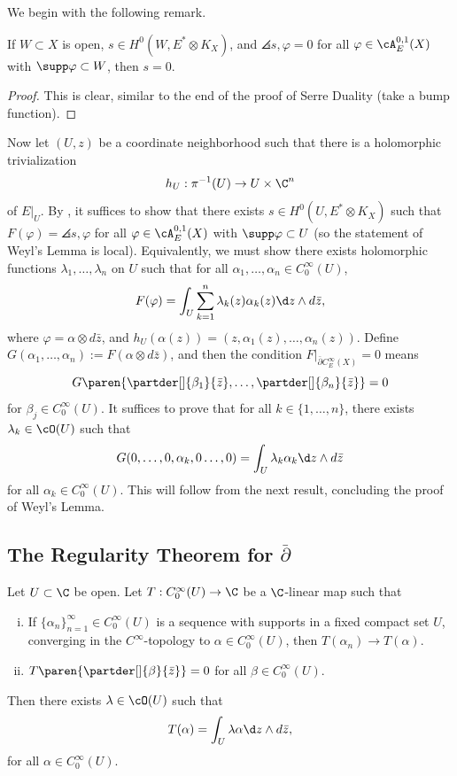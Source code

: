 \documentclass[11pt]{report}
\begin{document}
We begin with the following remark.
\begin{rmk} \label{rmk:inner-prod-0-s-0}
If $W \subset X$ is open, $s \in H^0(W,E^*\otimes K_X)$, and $\angles{s,\varphi}=0$ for all $\varphi \in \cA_E^{0,1}(X)$ with $\supp \varphi \subset W$, then $s=0$.
\end{rmk}

\begin{proof}
This is clear, similar to the end of the proof of Serre Duality (take a bump function).
\end{proof}

Now let $(U,z)$ be a coordinate neighborhood such that there is a holomorphic trivialization
\[
h_U: \pi^{-1}(U) \to U \times \C^n
\]
of $E|_U$. By , it suffices to show that there exists $s \in H^0(U,E^* \otimes K_X)$ such that $F(\varphi)= \angles{s,\varphi}$ for all $\varphi \in \cA_E^{0,1}(X)$ with $\supp \varphi \subset U$ (so the statement of Weyl's Lemma is local). Equivalently, we must show there exists holomorphic functions $\lambda_1,\dots,\lambda_n$ on $U$ such that for all $\alpha_1,\dots,\alpha_n \in C_0^\infty (U)$,
\[
F(\varphi)= \int _U \sum_{k=1}^n \lambda_k(z)\alpha_k(z)\d z \land d \bar z,
\]
where $\varphi = \alpha \otimes d\bar z$, and $h_U(\alpha(z))=(z,\alpha_1(z),\dots,\alpha_n(z))$. Define $G(\alpha_1,\dots,\alpha_n):= F(\alpha \otimes d \bar z)$, and then the condition $F|_{\bar \partial C_E^\infty (X)}=0$ means
\[
G\paren{ \partder[]{\beta_1}{\bar z},\dots, \partder[]{\beta_n}{\bar z} }=0
\]
for $\beta _j \in C_0^\infty (U)$. It suffices to prove that for all $k \in \{1,\dots, n\}$, there exists $\lambda _k \in \cO(U)$ such that
\[
G(0,\dots,0,\alpha_k,0\dots,0) = \int _U \lambda _k \alpha _k \d z \land d \bar z
\]
for all $\alpha _k \in C_0^\infty (U)$. This will follow from the next result, concluding the proof of Weyl's Lemma.

\subsection{\texorpdfstring{The Regularity Theorem for $\bar \partial$}{The Regularity Theorem for d-bar}}

\begin{thm} \label{thm:regularity-thm-for-dbar}
Let $U \subset \C$ be open. Let $T : C_0^\infty (U) \to \C$ be a $\C$-linear map such that
\begin{enumerate}[(i)]
    \item If $\{\alpha_n\}_{n=1}^\infty \in C_0^\infty (U)$ is a sequence with supports in a fixed compact set $U$, converging in the $C^\infty$-topology to $\alpha \in C_0^\infty (U)$, then $T(\alpha _n)\to T(\alpha)$.
    \item $T \paren{\partder[]{\beta}{\bar z}}=0$ for all $\beta \in C_0^\infty (U)$.
\end{enumerate}
Then there exists $\lambda \in \cO(U)$ such that \[
T(\alpha) = \int _U \lambda \alpha \d z \land d \bar z,
\]
for all $\alpha \in C_0^\infty (U)$.
\end{thm}
\end{document}

